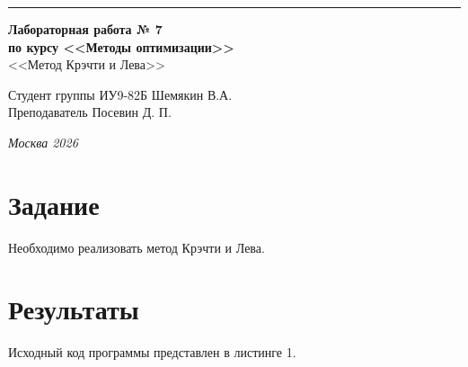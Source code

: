 \documentclass[a4paper, 14pt]{extarticle}
\begin{document}
\begin{titlepage}
\vspace*{-16pt}
\hspace{30pt}\rule{0.866\textwidth}{0.4pt}
  
\vspace{11em}

\begin{center}
\Large {\bf Лабораторная работа № 7} \\ 
\large {\bf по курсу <<Методы оптимизации>>} \\
\large <<Метод Крэчти и Лева>> 
\end{center}\normalsize

\vspace{8em}


\begin{flushright}
  {Студент группы ИУ9-82Б Шемякин В.А. \hspace*{15pt}\\ 
  \vspace{2ex}
  Преподаватель Посевин Д. П.\hspace*{15pt}}
\end{flushright}

\bigskip

\vfill
 

\begin{center}
\textsl{Москва 2026}
\end{center}
\end{titlepage}

\renewcommand{\ttdefault}{pcr}

\setlength{\tabcolsep}{3pt}
\newpage
\setcounter{page}{2}

\section{Задание}\label{Sect::task}
Необходимо реализовать метод Крэчти и Лева.
\section{Результаты}\label{Sect::res}

Исходный код программы представлен в листинге 1.
\end{document}
